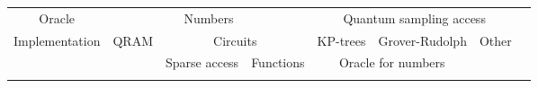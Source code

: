 \documentclass{article}
\title{\vspace{-5ex}}
\date{\vspace{-5ex}}
\begin{document}
\maketitle


\begin{table}[]
\centering
\begin{tabular}{ccclclcl}
\cline{2-7}
\multicolumn{1}{c|}{Oracle}                          & \multicolumn{3}{c|}{Numbers}                                                                                     & \multicolumn{3}{c|}{Quantum sampling access}                                                     &  \\ \cline{2-7}
\multicolumn{1}{c|}{\multirow{2}{*}{Implementation}} & \multicolumn{1}{c|}{\multirow{2}{*}{QRAM}} & \multicolumn{2}{c|}{Circuits}                                       & \multicolumn{1}{c|}{KP-trees} & \multicolumn{1}{c|}{Grover-Rudolph} & \multicolumn{1}{c|}{Other} &  \\ \cline{3-6}
\multicolumn{1}{c|}{}                                & \multicolumn{1}{c|}{}                      & \multicolumn{1}{c|}{Sparse access} & \multicolumn{1}{c|}{Functions} & \multicolumn{2}{c|}{Oracle for numbers}                             & \multicolumn{1}{c|}{}      &  \\ \cline{2-7}
\multicolumn{1}{l}{}                                 & \multicolumn{1}{l}{}                       & \multicolumn{1}{l}{}               &                                & \multicolumn{1}{l}{}          &                                     & \multicolumn{1}{l}{}       & 
\end{tabular}
\end{table}
 
\end{document}
